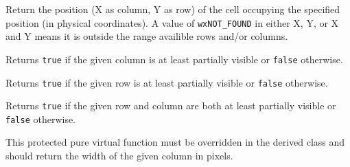 


\label{wxhvscrolledwindowhittest}



Return the position (X as column, Y as row) of the cell occupying the specified
position (in physical coordinates). A value of {\tt wxNOT\_FOUND} in either X,
Y, or X and Y means it is outside the range availible rows and/or columns.


\label{wxhvscrolledwindowiscolumnvisible}


Returns {\tt true} if the given column is at least partially visible or
{\tt false} otherwise.


\label{wxhvscrolledwindowisrowvisible}


Returns {\tt true} if the given row is at least partially visible or {\tt false}
otherwise.


\label{wxhvscrolledwindowisvisible}


Returns {\tt true} if the given row and column are both at least partially
visible or {\tt false} otherwise.


\label{wxhvscrolledwindowongetcolumnwidth}


This protected pure virtual function must be overridden in the derived class
and should return the width of the given column in pixels.




\label{wxhvscrolledwindowongetcolumnswidthhint}

